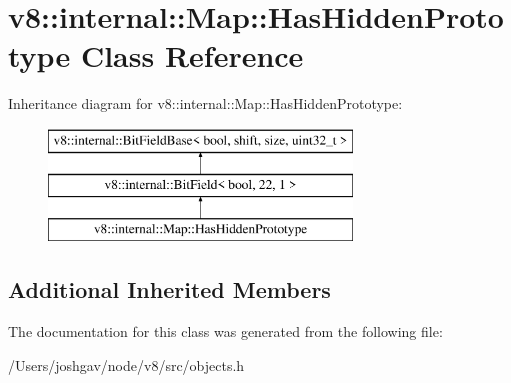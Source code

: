 \hypertarget{classv8_1_1internal_1_1_map_1_1_has_hidden_prototype}{}\section{v8\+:\+:internal\+:\+:Map\+:\+:Has\+Hidden\+Prototype Class Reference}
\label{classv8_1_1internal_1_1_map_1_1_has_hidden_prototype}
Inheritance diagram for v8\+:\+:internal\+:\+:Map\+:\+:Has\+Hidden\+Prototype\+:\begin{figure}[H]
\begin{center}
\leavevmode
\includegraphics[height=3.000000cm]{classv8_1_1internal_1_1_map_1_1_has_hidden_prototype}
\end{center}
\end{figure}
\subsection*{Additional Inherited Members}


The documentation for this class was generated from the following file\+:\begin{DoxyCompactItemize}
\item 
/\+Users/joshgav/node/v8/src/objects.\+h\end{DoxyCompactItemize}
